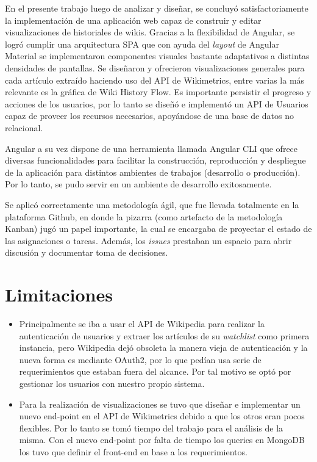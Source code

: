 En el presente trabajo luego de analizar y diseñar, se concluyó satisfactoriamente la implementación de una aplicación web capaz de construir y editar visualizaciones de historiales de wikis. Gracias a la flexibilidad de Angular, se logró cumplir una arquitectura SPA que con ayuda del \textit{layout} de Angular Material se implementaron componentes visuales bastante adaptativos a distintas densidades de pantallas. Se diseñaron y ofrecieron visualizaciones generales para cada artículo extraído haciendo uso del API de Wikimetrics, entre varias la más relevante es la gráfica de Wiki History Flow. Es importante persistir el progreso y acciones de los usuarios, por lo tanto se diseñó e implementó un API de Usuarios capaz de proveer los recursos necesarios, apoyándose de una base de datos no relacional.

Angular a su vez dispone de una herramienta llamada Angular CLI que ofrece diversas funcionalidades para facilitar la construcción, reproducción y despliegue de la aplicación para distintos ambientes de trabajos (desarrollo o producción). Por lo tanto, se pudo servir en un ambiente de desarrollo exitosamente.

Se aplicó correctamente una metodología ágil, que fue llevada totalmente en la plataforma Github, en donde la pizarra (como artefacto de la metodología Kanban) jugó un papel importante, la cual se encargaba de proyectar el estado de las asignaciones o tareas. Además, los \textit{issues} prestaban un espacio para abrir discusión y documentar toma de decisiones.

\section{Limitaciones}

\begin{itemize}
    \item Principalmente se iba a usar el API de Wikipedia para realizar la autenticación de usuarios y extraer los artículos de su \textit{watchlist} como primera instancia, pero Wikipedia dejó obsoleta la manera vieja de autenticación y la nueva forma es mediante OAuth2, por lo que pedían usa serie de requerimientos que estaban fuera del alcance. Por tal motivo se optó por gestionar los usuarios con nuestro propio sistema.
    
    \item Para la realización de visualizaciones se tuvo que diseñar e implementar un nuevo end-point en el API de Wikimetrics debido a que los otros eran pocos flexibles. Por lo tanto se tomó tiempo del trabajo para el análisis de la misma. Con el nuevo end-point por falta de tiempo los queries en MongoDB los tuvo que definir el front-end en base a los requerimientos.
\end{itemize}

